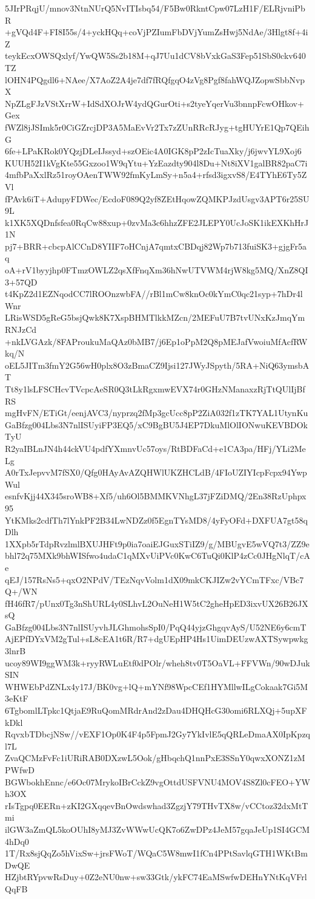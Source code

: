 5JIrPRqjU/mnov3NtnNUrQ5NvITIsbq54/F5Bw0RkntCpw07LzH1F/ELRjvniPbR
+gVQd4F+FI8I55s/4+yckHQq+coVjPZIumFbDVjYumZsHwj5NdAe/3Hlgt8f+4iZ
teykEcxOWSQxlyf/YwQW5Ss2b18M+qJ7Uu1dCV8bVxkGaS3Fep51SbS0ckv640TZ
lOHN4PQgdl6+NAee/X7AoZ2A4je7df7fRQfgqO4zVg8Pgf8fahWQJZopwSbbNvpX
NpZLgFJzVStXrrW+IdSdXOJrW4ydQGurOti+s2tyeYqerVu3bnnpFcwOHkov+Gex
fWZl8jJSImk5r0CiGZrcjDP3A5MaEvVr2Tx7zZUnRRcRJyg+tgHUYrE1Qp7QEihG
6fe+LPaKRok0YQzjDLeIJssyd+szOEic4A0IGK8pP2zIcTuaXky/j6jwvYL9Xoj6
KUUH52I1kVgKte55Gxzoo1W9qYtu+YzEazdty904l8Du+Nt8iXV1galBR82paC7i
4mfbPaXxlRz51royOAenTWW92fmKyLmSy+n5a4+rfsd3igxvS8/E4TYhE6Ty5ZVl
fPAvk6iT+AdupyFDWec/EcdoF089Q2yf8ZEtHqowZQMKPJzdUsgv3APT6r25SU9L
k1XK5XQDnfsfea0RqCw88xup+0zvMa3c6hhzZFE2JLEPY0UcJoSK1ikEXKhHrJ1N
pj7+BRR+cbcpAlCCnD8YIIF7oHCnjA7qmtxCBDqj82Wp7b713fuiSK3+gjgFr5aq
oA+rV1byyjhp0FTmzOWLZ2qsXfFnqXm36hNwUTVWM4rjW8kg5MQ/XnZ8QI3+57QD
t4KpZ2d1EZNqodCC7lROOnzwbFA//rBl1mCw8knOc0kYmC0qc21syp+7hDr4lWnr
LRisWSD5gReG5bsjQwk8K7XspBHMTlkkMZcn/2MEFuU7B7tvUNxKzJmqYmRNJzCd
+nkLVGAzk/8FAProukuMaQAz0bMB7/j6Ep1oPpM2Q8pMEJafVwoiuMfAcfRWkq/N
oEL5JITm3fmY2G56wH0plx8O3zBmaCZ9Ijsi127JWyJSpyth/5RA+NiQ63ymsbAT
Tt8y1lsLFSCHcvTVcpcAeSR0Q3tLkRgxmwEVX74r0GHzNManaxzRjTtQUlIjBfRS
mgHvFN/ETiGt/eenjAVC3/nyprzq2fMp3gcUcc8pP2ZiA032f1zTK7YAL1UtynKu
GaBfzg004Lbs3N7nlISUyiFP3EQ5/xC9BgBU5J4EP7DkuMlOlIONwuKEVBDOkTyU
R2yaIBLnJN4h44ckVU4pdfYXmnvUc57oys/RtBDFaCd+e1CA3pa/HFj/YLi2MeLg
A0rTxJepvvM7fSX0/Qfg0HAyAvAZQHWlUKZHCLdB/4FIoUZIYIcpFcpx94YwpWul
esnfvKjj44X345sroWB8+Xf5/uh6Ol5BMMKVNhgL37jFZiDMQ/2En38RzUphpx95
YtKMks2cdfTh7lYnkPF2B34LwNDZz0f5EgnTYsMD8/4yFyOFd+DXFUA7gt58qDlh
1XXpb5rTdpRvzlmlBXUJHFt9p0ia7oaiEJGuxSTiIZ9/g/MBUgvE5wVQ7t3/ZZ9e
bhl72q75MXk9bhWISfwo4udaC1qMXvUiPVc0KwC6TuQi0KlP4zCc0JHgNlqT/cAe
qEJ/157RsNs5+qxO2NPdV/TEzNqvVolm1dX09mkCKJIZw2vYCmTFxc/VBc7Q+/WN
fH46fR7/pUnx0Tg3nShURL4y0SLhvL2OuNeH1W5tC2gheHpED3ixvUX26B26JXsQ
GaBfzg004Lbs3N7nlISUyvhJLGhmohsSpI0/PqQ44yjzGhgqvAyS/U52NE6y6cmT
AjEPfDYxVM2gTul+sL8cEA1t6R/R7+dgUEpHP4Hs1UimDEUzwAXTSywpwkg3lnrB
ucoy89WI9ggWM3k+ryyRWLuEtf0dPOlr/wheh8tv0T5OaVL+FFVWn/90wDJukSIN
WHWEbPdZNLx4y17J/BK0vg+lQ+mYNf98WpcCEf1HYMllwILgCokaak7Gi5M3eKtF
6TgbomlLTpkc1QtjaE9RuQomMRdrAnd2zDau4DHQHcG30omi6RLXQj+5upXFkDkl
RqvxbTDbcjNSw//vEXF1Op0K4F4p5FpmJ2Gy7YkIvlE5qQRLeDmaAX0IpKpzql7L
ZvaQCMzFvFc1iURiRAB0DXzwL5Ook/gHbqchQ1nnPxE3SSnY0qwxXONZ1zMPWfwD
BGWbokhEnnc/e6Oc07MrykoIBrCckZ9vgOttdUSFVNU4MOV4S8Zl0cFEO+YWh3OX
rIsTgpq0EERn+zKI2GXqqevBnOwdswhad3ZgzjY79THvTX8w/vCCtoz32dxMtTmi
ilGW3aZmQL5koOUhI8yMJ3ZvWWwUcQK7o6ZwDPz4JeM57gqaJeUp1SI4GCM4hDq0
1T/Rx8sjQqZo5hVixSw+jrsFWoT/WQaC5W8mwI1fCn4PPtSavlqGTH1WKtBmDwQE
HZjbtRYpvwRsDuy+0Z2eNU0nw+sw33Gtk/ykFC74EaMSwfwDEHnYNtKqVFrlQqFB
